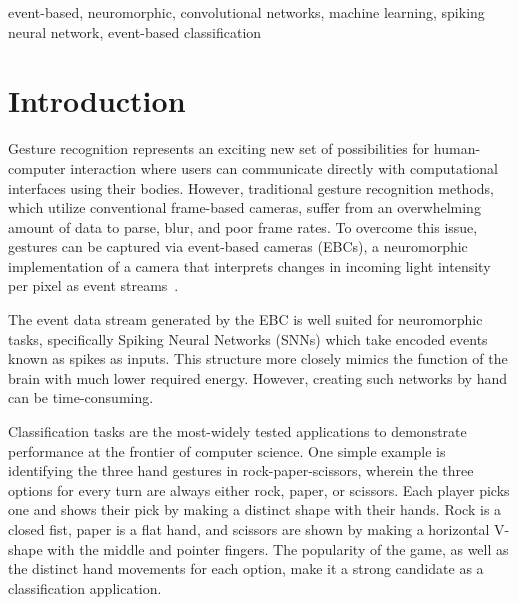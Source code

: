 \documentclass[conference]{IEEEtran}
\begin{document}
\begin{IEEEkeywords}
event-based, neuromorphic, convolutional networks, machine learning, spiking neural network, event-based classification
\end{IEEEkeywords}

\section{Introduction}

Gesture recognition represents an exciting new set of possibilities for human-computer interaction where users can communicate directly with computational interfaces using their bodies. However, traditional gesture recognition methods, which utilize conventional frame-based cameras, suffer from an overwhelming amount of data to parse, blur, and poor frame rates. To overcome this issue, gestures can be captured via event-based cameras (EBCs), a neuromorphic implementation of a camera that interprets changes in incoming light intensity per pixel as event streams~\cite{Gallego_Delbruck_Orchard_Bartolozzi_Taba_Censi_Leutenegger_Davison_Conradt_Daniilidis_et_al._2022}.

The event data stream generated by the EBC is well suited for neuromorphic tasks, specifically Spiking Neural Networks (SNNs) which take encoded events known as spikes as inputs. This structure more closely mimics the function of the brain with much lower required energy. However, creating such networks by hand can be time-consuming.


Classification tasks are the most-widely tested applications to demonstrate performance at the frontier of computer science. One simple example is identifying the three hand gestures in rock-paper-scissors, wherein the three options for every turn are always either rock, paper, or scissors. Each player picks one and shows their pick by making a distinct shape with their hands. Rock is a closed fist, paper is a flat hand, and scissors are shown by making a horizontal V-shape with the middle and pointer fingers. The popularity of the game, as well as the distinct hand movements for each option, make it a strong candidate as a classification application.
\end{document}
